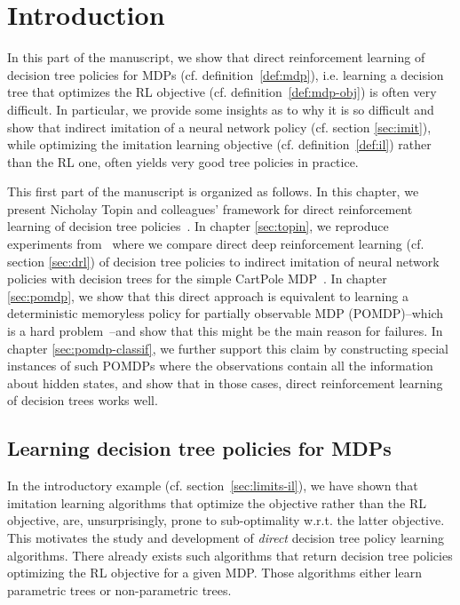 \chapter{Introduction}\label{sec:intro-pomdp}
In this part of the manuscript, we show that direct reinforcement learning of decision tree policies for MDPs (cf. definition~\ref{def:mdp}), i.e. learning a decision tree that optimizes the RL objective (cf. definition~\ref{def:mdp-obj}) is often very difficult.
In particular, we provide some insights as to why it is so difficult and show that indirect imitation of a neural network policy (cf. section \ref{sec:imit}), while optimizing the imitation learning objective (cf. definition~\ref{def:il}) rather than the RL one, often yields very good tree policies in practice.

This first part of the manuscript is organized as follows.
In this chapter, we present Nicholay Topin and colleagues' framework for direct reinforcement learning of decision tree policies~\cite{topin2021iterative}.
In chapter \ref{sec:topin}, we reproduce experiments from~\cite{topin2021iterative} where we compare direct deep reinforcement learning (cf. section \ref{sec:drl}) of decision tree policies to indirect imitation of neural network policies with decision trees for the simple CartPole MDP~\cite{cartpole}.
In chapter \ref{sec:pomdp}, we show that this direct approach is equivalent to learning a deterministic memoryless policy for partially observable MDP (POMDP)\cite{POMDP,chap2}--which is a hard problem~\cite{littman1}--and show that this might be the main reason for failures.
In chapter \ref{sec:pomdp-classif}, we further support this claim by constructing special instances of such POMDPs where the observations contain all the information about hidden states, and show that in those cases, direct reinforcement learning of decision trees works well.  

\section{Learning decision tree policies for MDPs}\label{related-work-pomdp}
In the introductory example (cf. section~\ref{sec:limits-il}), we have shown that imitation learning algorithms that optimize the objective rather than the RL objective, are, unsurprisingly, prone to sub-optimality w.r.t. the latter objective.
This motivates the study and development of \textit{direct} decision tree policy learning algorithms.
There already exists such algorithms that return decision tree policies optimizing the RL objective for a given MDP.
Those algorithms either learn parametric trees or non-parametric trees.

